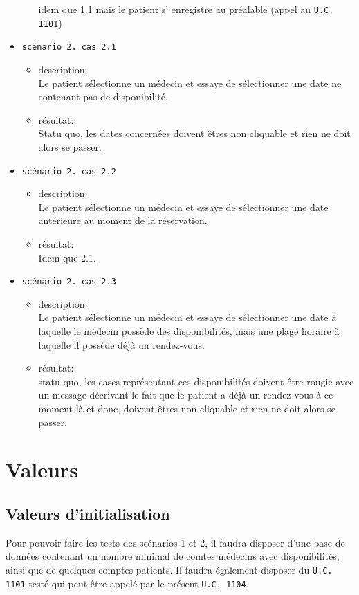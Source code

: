 \begin{itemize}
\begin{itemize}
					idem que 1.1 mais le patient s’ enregistre au préalable
					(appel au \texttt{U.C. 1101})\\
			\end{itemize}
		\item[] \texttt{scénario 2. cas 2.1}
			\begin{itemize}
				\item description:\\
					Le patient sélectionne un médecin et essaye de sélectionner
					une date ne contenant pas de disponibilité.
				\item résultat: \\
					Statu quo, les dates concernées doivent êtres non cliquable
					et rien ne doit alors se passer.\\
			\end{itemize}
		\item[] \texttt{scénario 2. cas 2.2}
			\begin{itemize}
				\item description:\\
					Le patient sélectionne un médecin et essaye de sélectionner
					une date antérieure au moment de la réservation.
				\item résultat: \\
					Idem que 2.1.\\
			\end{itemize}
		\item[] \texttt{scénario 2. cas 2.3}
			\begin{itemize}
				\item description:\\
					Le patient sélectionne un médecin et essaye de sélectionner
					une date à laquelle le médecin possède des disponibilités,
					mais une plage horaire à laquelle il possède déjà un
					rendez-vous.
				\item résultat: \\
					statu quo, les cases représentant ces disponibilités
					doivent être rougie avec un message décrivant le fait que le
					patient a déjà un rendez vous à ce moment là et donc,
					doivent êtres non cliquable et rien ne doit alors se passer.\\
			\end{itemize}
	\end{itemize}
	\newpage
	\section{Valeurs}
	\subsection{Valeurs d'initialisation}
	Pour pouvoir faire les tests des scénarios 1 et 2, il faudra disposer d’une
	base de données contenant un nombre minimal de comtes médecins avec
	disponibilités, ainsi que de quelques comptes patients.
	Il faudra également disposer du \texttt{U.C. 1101} testé qui peut être appelé par le
	présent \texttt{U.C. 1104}.
